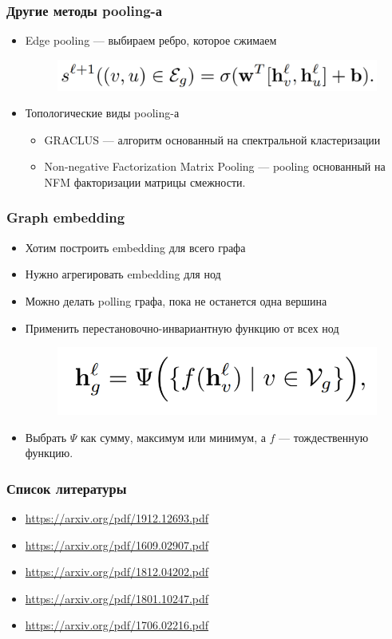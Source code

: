 \documentclass{beamer}
\begin{document}
\begin{frame}
\frametitle{Другие методы pooling-а}
\begin{itemize}
	\item Edge pooling --- выбираем ребро, которое сжимаем
	\begin{figure}
		\includegraphics[width=0.7\columnwidth]{edge_pooling.png}
	\end{figure}
	\item Топологические виды pooling-а
	\begin{itemize}
		\item GRACLUS --- алгоритм основанный на спектральной кластеризации
		\item Non-negative Factorization Matrix Pooling --- pooling основанный на NFM факторизации матрицы смежности.
	\end{itemize}
\end{itemize}
\end{frame}

\begin{frame}
\frametitle{Graph embedding}
\begin{itemize}
	\item Хотим построить embedding для всего графа
	\item Нужно агрегировать embedding для нод
	\item Можно делать polling графа, пока не останется одна вершина
	\item Применить перестановочно-инвариантную функцию от всех нод
	\begin{figure}
		\includegraphics[width=0.5\columnwidth]{graph_classification.png}
	\end{figure}
	\item Выбрать $\Psi$ как сумму, максимум или минимум, а $f$ --- тождественную функцию.
\end{itemize}
\end{frame}

\begin{frame}
\frametitle{Список литературы}
\begin{itemize}
	\item \url{https://arxiv.org/pdf/1912.12693.pdf}
	\item \url{https://arxiv.org/pdf/1609.02907.pdf}
	\item \url{https://arxiv.org/pdf/1812.04202.pdf}
	\item \url{https://arxiv.org/pdf/1801.10247.pdf}
	\item \url{https://arxiv.org/pdf/1706.02216.pdf}
\end{itemize}
\end{frame}
\end{document}
